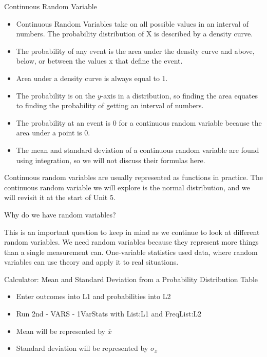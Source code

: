 \documentclass[../stats.tex]{subfiles}
\begin{document}
Continuous Random Variable 
\begin{itemize}
    \item Continuous Random Variables take on all possible values in an interval of numbers. The probability distribution of X is described by a density curve.
    \item The probability of any event is the area under the density curve and above, below, or between the values x that define the event.
    \item Area under a density curve is always equal to 1.
    \item The probability is on the $y$-axis in a distribution, so finding the area equates to finding the probability of getting an interval of numbers.
    \item The probability at an event is 0 for a continuous random variable because the area under a point is 0.
    \item The mean and standard deviation of a continuous random variable are found using integration, so we will not discuss their formulas here.
\end{itemize}

Continuous random variables are usually represented as functions in practice. The continuous random variable we will explore is the normal distribution, and we will revisit it at the start of Unit 5.

Why do we have random variables?

This is an important question to keep in mind as we continue to look at different random variables. We need random variables because they represent more things than a single measurement can. One-variable statistics used data, where random variables can use theory and apply it to real situations.

Calculator: Mean and Standard Deviation from a Probability Distribution Table 
\begin{itemize}
    \item Enter outcomes into L1 and probabilities into L2 
    \item Run 2nd - VARS - 1VarStats with List:L1 and FreqList:L2 
    \item Mean will be represented by $\overline{x}$
    \item Standard deviation will be represented by $\sigma_x$
\end{itemize}
\end{document}
